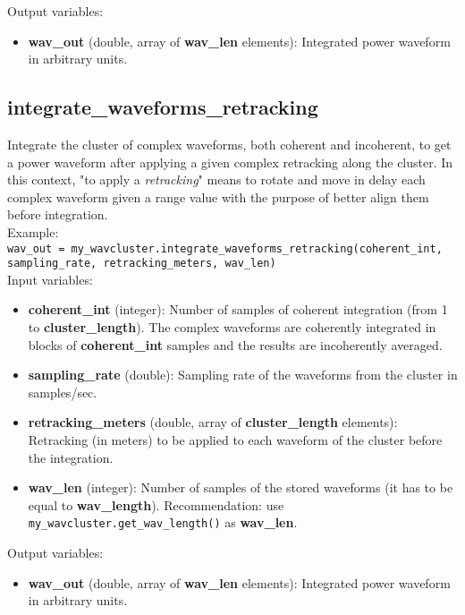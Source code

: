 Output variables:
\begin{itemize}
\item {\bf wav\_out} (double, array of {\bf wav\_len} elements): Integrated power waveform in arbitrary units.
\end{itemize}


\subsection{integrate\_waveforms\_retracking}

Integrate the cluster of complex waveforms, both coherent and incoherent, to get a power waveform after applying a given complex retracking along the cluster. In this context, "to apply a {\it retracking}" means to rotate and move in delay each complex waveform given a range value with the purpose of better align them before integration.\\

Example:\\

\texttt{wav\_out = my\_wavcluster.integrate\_waveforms\_retracking(coherent\_int, sampling\_rate, retracking\_meters, wav\_len)}\\

Input variables:
\begin{itemize}
\item {\bf coherent\_int} (integer): Number of samples of coherent integration (from 1 to {\bf cluster\_length}). The complex waveforms are coherently integrated in blocks of {\bf coherent\_int} samples and the results are incoherently averaged.
\item {\bf sampling\_rate} (double): Sampling rate of the waveforms from the cluster in samples/sec.
\item {\bf retracking\_meters} (double, array of {\bf cluster\_length} elements): Retracking (in meters) to be applied to each waveform of the cluster before the integration.
\item {\bf wav\_len} (integer): Number of samples of the stored waveforms (it has to be equal to {\bf wav\_length}). Recommendation: use \texttt{my\_wavcluster.get\_wav\_length()} as {\bf wav\_len}.
\end{itemize}

Output variables:
\begin{itemize}
\item {\bf wav\_out} (double, array of {\bf wav\_len} elements): Integrated power waveform in arbitrary units.
\end{itemize}


